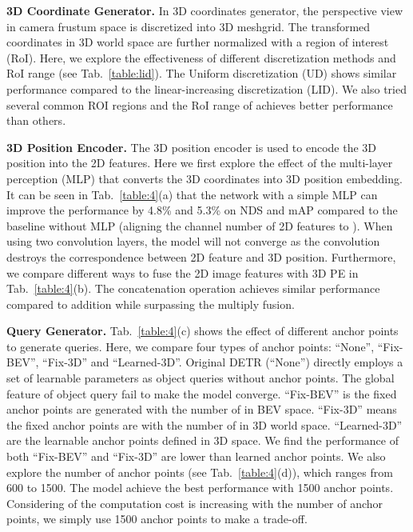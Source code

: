 \documentclass[runningheads]{llncs}
\begin{document}
\noindent \textbf{3D Coordinate Generator.}
In 3D coordinates generator, the perspective view in camera frustum space is discretized into 3D meshgrid. The transformed coordinates in 3D world space are further normalized with a region of interest (RoI). Here, we explore the effectiveness of different discretization methods and RoI range (see Tab.~\ref{table:lid}). The Uniform discretization (UD) shows similar performance compared to the linear-increasing discretization (LID). We also tried several common ROI regions and the RoI range of   achieves better performance than others.

\noindent \textbf{3D Position Encoder.}
The 3D position encoder is used to encode the 3D position into the 2D features. Here we first explore the effect of the multi-layer perception (MLP) that converts the 3D coordinates into 3D position embedding. It can be seen in Tab.~\ref{table:4}(a) that the network with a simple MLP can improve the performance by 4.8\% and 5.3\% on NDS and mAP compared to the baseline without MLP (aligning the channel number of 2D features to ). When using two  convolution layers, the model will not converge as the  convolution destroys the correspondence between 2D feature and 3D position. Furthermore, we compare different ways to fuse the 2D image features with 3D PE in Tab.~\ref{table:4}(b). The concatenation operation achieves similar performance compared to addition while surpassing the multiply fusion.

\noindent \textbf{Query Generator.}
Tab.~\ref{table:4}(c) shows the effect of different anchor points to generate queries. Here, we compare four types of anchor points: ``None'', ``Fix-BEV'', ``Fix-3D'' and ``Learned-3D''. Original DETR (``None'') directly employs a set of learnable parameters as object queries without anchor points. The global feature of object query fail to make the model converge. ``Fix-BEV'' is the fixed anchor points are generated with the number of  in BEV space. ``Fix-3D'' means the fixed anchor points are with the number of  in 3D world space. ``Learned-3D'' are the learnable anchor points defined in 3D space. We find the performance of both ``Fix-BEV'' and ``Fix-3D'' are lower than learned anchor points. We also explore the number of anchor points (see Tab.~\ref{table:4}(d)), which ranges from 600 to 1500. The model achieve the best performance with 1500 anchor points. Considering of the computation cost is increasing with the number of anchor points, we simply use 1500 anchor points to make a trade-off.
\end{document}
